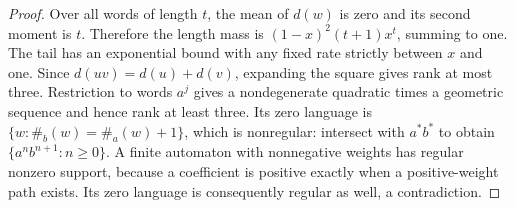 \begin{proof}
Over all words of length $t$, the mean of $d(w)$ is zero and its second
moment is $t$. Therefore the length mass is
$(1-x)^2(t+1)x^t$, summing to one. The tail has an exponential bound
with any fixed rate strictly between $x$ and one.
Since $d(uv)=d(u)+d(v)$, expanding the square gives rank at most three.
Restriction to words $a^j$ gives a nondegenerate quadratic times a
geometric sequence and hence rank at least three. Its zero language is
$\{w:\#_b(w)=\#_a(w)+1\}$, which is nonregular: intersect with
$a^*b^*$ to obtain $\{a^nb^{n+1}:n\ge0\}$.
A finite automaton with nonnegative weights has regular nonzero support,
because a coefficient is positive exactly when a positive-weight path
exists. Its zero language is consequently regular as well, a contradiction.
\end{proof}
